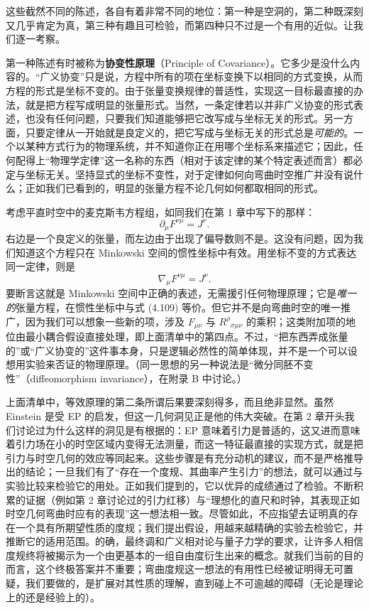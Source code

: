 这些截然不同的陈述，各自有着非常不同的地位：第一种是空洞的，第二种既深刻又几乎肯定为真，第三种有趣且可检验，而第四种只不过是一个有用的近似。让我们逐一考察。

第一种陈述有时被称为\textbf{协变性原理}（Principle of Covariance）。它多少是没什么内容的。“广义协变”只是说，方程中所有的项在坐标变换下以相同的方式变换，从而方程的形式是坐标不变的。由于张量变换规律的普适性，实现这一目标最直接的办法，就是把方程写成明显的张量形式。当然，一条定律若以并非广义协变的形式表述，也没有任何问题，只要我们知道能够把它改写成与坐标无关的形式。另一方面，只要定律从一开始就是良定义的，把它写成与坐标无关的形式总是\emph{可能的}。一个以某种方式行为的物理系统，并不知道你正在用哪个坐标系来描述它；因此，任何配得上“物理学定律”这一名称的东西（相对于该定律的某个特定表述而言）都必定与坐标无关。坚持显式的坐标不变性，对于定律如何向弯曲时空推广并没有说什么；正如我们已看到的，明显的张量方程不论几何如何都取相同的形式。

考虑平直时空中的麦克斯韦方程组，如同我们在第 1 章中写下的那样：
\begin{equation*}
\partial_\mu F^{\nu\mu} = J^\nu.
\tag{4.109}
\end{equation*}
右边是一个良定义的张量，而左边由于出现了偏导数则不是。这没有问题，因为我们知道这个方程只在 Minkowski 空间的惯性坐标中有效。用坐标不变的方式表达同一定律，则是
\begin{equation*}
\nabla_\mu F^{\nu\mu} = J^\nu.
\tag{4.110}
\end{equation*}
要断言这就是 Minkowski 空间中正确的表述，无需援引任何物理原理；它是\emph{唯一的}张量方程，在惯性坐标中与式 (4.109) 等价。但它并不是向弯曲时空的唯一推广，因为我们可以想象一些新的项，涉及 $F_{\mu\nu}$ 与 $R^\rho{}_{\sigma\mu\nu}$ 的乘积；这类附加项的地位由最小耦合假设直接处理，即上面清单中的第四点。不过，“把东西弄成张量的”或“广义协变的”这件事本身，只是逻辑必然性的简单体现，并不是一个可以设想用实验来否证的物理原理。（同一思想的另一种说法是“微分同胚不变性”（diffeomorphism invariance），在附录 B 中讨论。）

上面清单中，等效原理的第二条所谓后果要深刻得多，而且绝非显然。虽然 Einstein 是受 EP 的启发，但这一几何洞见正是他的伟大突破。在第 2 章开头我们讨论过为什么这样的洞见是有根据的：EP 意味着引力是普适的，这又进而意味着引力场在小的时空区域内变得无法测量，而这一特征最直接的实现方式，就是把引力与时空几何的效应等同起来。这些步骤是有充分动机的建议，而不是严格推导出的结论；一旦我们有了“存在一个度规、其曲率产生引力”的想法，就可以通过与实验比较来检验它的用处。正如我们提到的，它以优异的成绩通过了检验。不断积累的证据（例如第 2 章讨论过的引力红移）与“理想化的直尺和时钟，其表现正如时空几何弯曲时应有的表现”这一想法相一致。尽管如此，不应指望去证明真的存在一个具有所期望性质的度规；我们提出假设，用越来越精确的实验去检验它，并推断它的适用范围。的确，最终调和广义相对论与量子力学的要求，让许多人相信度规终将被揭示为一个由更基本的一组自由度衍生出来的概念。就我们当前的目的而言，这个终极答案并不重要；弯曲度规这一想法的有用性已经被证明得无可置疑，我们要做的，是扩展对其性质的理解，直到碰上不可逾越的障碍（无论是理论上的还是经验上的）。

